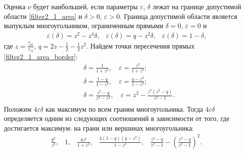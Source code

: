 \documentclass[a4paper,article,14pt]{extarticle}
\begin{document}
Оценка $\nu$ будет наибольшей, если параметры $\varepsilon$, $\delta$ лежат на границе допустимой области \eqref{filter2_1_area} и $\delta > 0$, $\varepsilon > 0$. Граница допустимой области является  выпуклым многоугольником, ограниченным прямыми $\delta = 0$, $\varepsilon = 0$ и
 \begin{equation}\label{filter2_1_area_border}
\begin{aligned}
\varepsilon(\delta)=z^2 - z^4\delta \text{,} \quad \varepsilon(\delta)=q - z^2\delta \text{,}
\quad \varepsilon(\delta)=1 - \delta \text{,}
\end{aligned}
\end{equation}
где $z = \frac{\tau_{p1}}{\tau_{z1}}$, $q = 2z - \frac{1}{2} - \frac{1}{2}z^2$. Найдем точки пересечения прямых \eqref{filter2_1_area_border}:
  \begin{equation}
 \begin{aligned}
&\delta = \frac{1}{1+z^2}, \quad \varepsilon = \frac{z^2}{1+z^2};\\
&\delta = \frac{1-q}{1-z^2}, \quad  \varepsilon = \frac{q-z^2}{1-z^2};\\
&\delta = \frac{z^2-q}{z^4-z^2}, \quad  \varepsilon = z^2 - \frac{z^2(z^2-q)}{z^2-1}.\\
 \end{aligned}
\end{equation}
Положим $4\varepsilon\delta$ как максимум по всем граням многоугольника. Тогда $4\varepsilon\delta$ определяется одним из следующих соотношений в зависимости от того, где достигается максимум: на грани или вершинах многоугольника:
 \begin{equation}\label{filter2_max}
\begin{aligned}
\frac{q^2}{z^2}\text{,} \quad 1 \text{,} \quad \frac{4z^2}{1+z^2} \text{,} \quad \frac{4(1-q)(q-z^2)}{1-z^2} \text{,} \quad \frac{z^2-q}{z^2-1} - \left(\frac{z^2-q}{z^2-1}\right)^2.
\end{aligned}
\end{equation}

\end{document}
